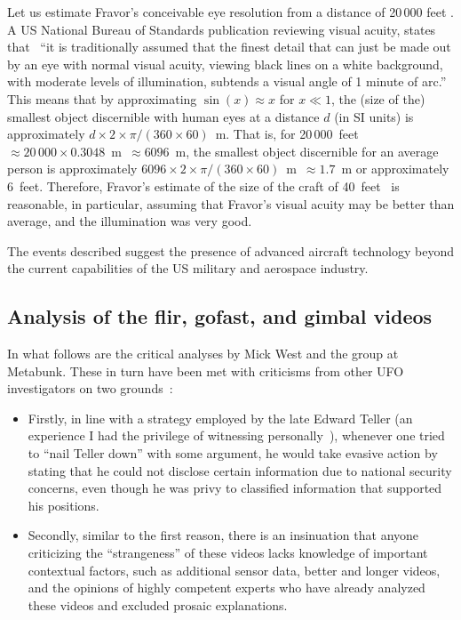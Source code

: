 Let us estimate Fravor's conceivable eye resolution from a distance of 20\,000 feet \cite[time = 646\,s]{Powerfuljre2019Oct}. A US National Bureau of Standards publication reviewing visual acuity, states that~\cite[p.~10]{Howett1983Jul} ``it is traditionally assumed that the finest detail that can just be made out by an eye with normal visual acuity, viewing black lines on a white background, with moderate levels of illumination, subtends a visual angle of 1 minute of arc.'' This means that by approximating
$\sin(x) \approx x$ for $x\ll 1$, the (size of the) smallest object discernible with human eyes at a distance $d$ (in SI units)
is approximately $d \times 2 \times \pi /(360\times 60)$~m. That is, for 20\,000~feet~$\approx 20\,000 \times 0.3048$~m~$\approx 6096$~m,
the smallest object discernible for an average person is approximately $6096 \times 2 \times \pi /(360\times 60)$~m~$\approx 1.7$~m or approximately 6~feet.
Therefore, Fravor's estimate of the size of the craft of 40~feet~\cite[time\,=\,652\,s]{Powerfuljre2019Oct} is reasonable, in particular,
assuming that Fravor's visual acuity may be better than average, and the illumination was very good.

The events described suggest the presence of advanced aircraft technology beyond the current capabilities
of the US military and aerospace industry.

\subsection{Analysis of the flir, gofast, and gimbal videos}

In what follows are the critical analyses by Mick West and the group at Metabunk.
These in turn have been met with criticisms from other UFO investigators on two grounds~\cite{WestElizondo2021Mar}:
\begin{itemize}
\item Firstly, in line with a strategy employed by the late Edward Teller
(an experience I had the privilege of witnessing personally~\cite{Etim1992Aug}),
whenever one tried to ``nail Teller down'' with some argument,
he would take evasive action by stating that he could not disclose certain information due to national security concerns,
even though he was privy to classified information that supported his positions.
\item Secondly, similar to the first reason, there is an insinuation that anyone criticizing the ``strangeness'' of these videos
lacks knowledge of important contextual factors,
such as additional sensor data, better and longer videos,
and the opinions of highly competent experts who have already analyzed these videos and excluded prosaic explanations.
\end{itemize}

